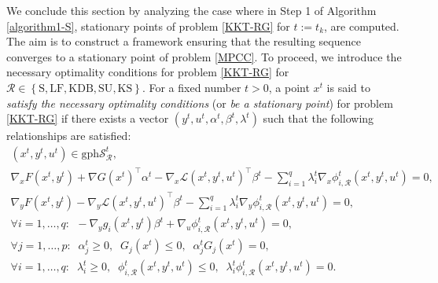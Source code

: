 We conclude this section by analyzing the case where in Step 1 of Algorithm \ref{algorithm1-S},  stationary points of problem \eqref{KKT-RG} for $t:=t_k$, are computed. The aim is to construct a framework ensuring that the resulting sequence converges to a stationary point of problem \eqref{MPCC}. To proceed, we introduce the  necessary optimality conditions for problem \eqref{KKT-RG} for $\mathcal{R}\in \left\{\mbox{S}, \mbox{LF}, \mbox{KDB}, \mbox{SU}, \mbox{KS}\right\}$. For a fixed number $t>0$, a point $x^t$ is said to \emph{satisfy the necessary optimality conditions} (or \emph{be a stationary point}) for problem \eqref{KKT-RG} if there exists a vector $(y^{t},u^{t}, \alpha^{t}, \beta^{t}, \lambda^{t})$ such that the following relationships are satisfied:
\begin{eqnarray}
(x^{t},y^{t},u^{t})\in\mbox{gph}\mathcal{S}^{t}_\mathcal{R}, \label{Er0S*}\\
\nabla_{x}F(x^{t},y^{t})+\nabla G(x^{t})^{\top}\alpha^{t}-\nabla
_{x}\mathcal{L}(x^{t},y^{t},u^{t})^{\top}\beta^{t}-\sum\limits_{i=1}
^{q} \lambda_{i}^{t} \nabla_{x}
\phi^t_{i, \mathcal{R}}(x^{t},y^{t},u^{t})=0,\label{Er1S*}\\
\nabla_{y}F(x^{t},y^{t})-\nabla_{y}\mathcal{L}(x^{t},y^{t},u^{t})^{\top}
\beta^{t}-\sum\limits_{i=1}^{q}  \lambda_{i}^{t}  \nabla_{y}
\phi^t_{i, \mathcal{R}}(x^{t},y^{t},u^{t})=0,\\
\forall i=1, \ldots, q:\;\, -\nabla_{y}g_{i}(x^{t},y^{t})\beta^{t}+\nabla_{u}
\phi^t_{i, \mathcal{R}}(x^{t},y^{t},u^{t})=0,\\[1ex]
\forall j=1, \ldots, p: \;\; \alpha_{j}^{t} \geq 0,\;\; G_j(x^t)\leq 0, \;\; \alpha_{j}^{t}G_{j}(x^{t})=0,\label{Er011*}\\
\forall i=1, \ldots, q:\;\; \lambda^t_i\geq 0, \;\; \phi^t_{i, \mathcal{R}}(x^{t},y^{t},u^{t}) \leq 0, \;\; \lambda^t_i \phi^t_{i, \mathcal{R}}(x^{t},y^{t},u^{t})=0.\label{Er5S*}
\end{eqnarray}
